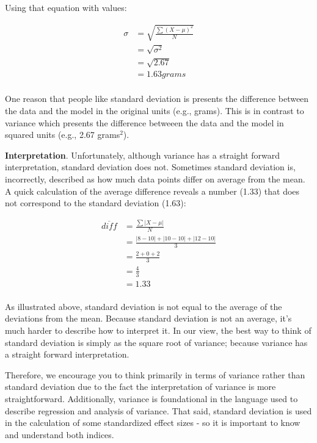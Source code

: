 \documentclass[
]{krantz}
\begin{document}
Using that equation with values:

\[
\begin{aligned} 
\sigma &= \sqrt{\frac{\sum{(X - \mu)^2}}{N}}\\
&= \sqrt{\sigma^2} \\
&= \sqrt{2.67} \\
&= 1.63 grams\\
\end{aligned} 
\]

One reason that people like standard deviation is presents the difference between the data and the model in the original units (e.g., grams). This is in contrast to variance which presents the difference betweeen the data and the model in squared units (e.g., 2.67 grams\(^2\)).

\textbf{Interpretation}. Unfortunately, although variance has a straight forward interpretation, standard deviation does not. Sometimes standard deviation is, incorrectly, described as how much data points differ on average from the mean. A quick calculation of the average difference reveals a number (1.33) that does not correspond to the standard deviation (1.63):

\[
\begin{aligned} 
\overline{diff} &= \frac{\sum{|X - \mu|}}{N}\\
&= \frac{|8-10| + |10-10| + |12 - 10|}{3}\\
&= \frac{2 + 0 + 2}{3}\\
&= \frac{4}{3}\\
&= 1.33\\
\end{aligned} 
\]

As illustrated above, standard deviation is not equal to the average of the deviations from the mean. Because standard deviation is not an average, it's much harder to describe how to interpret it. In our view, the best way to think of standard deviation is simply as the square root of variance; because variance has a straight forward interpretation.

Therefore, we encourage you to think primarily in terms of variance rather than standard deviation due to the fact the interpretation of variance is more straightforward. Additionally, variance is foundational in the language used to describe regression and analysis of variance. That said, standard deviation is used in the calculation of some standardized effect sizes - so it is important to know and understand both indices.
\end{document}
